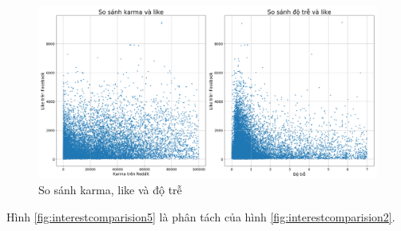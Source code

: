 \documentclass[10pt,a4paper]{article}
\begin{document}
\FloatBarrier
\begin{figure}[!ht]
    \centering
    \includegraphics[width=\textwidth]{img/InterestComparision2.png}
    \caption{So sánh karma, like và độ trễ}
    \label{fig:interestcomparision5}
\end{figure}

Hình \eqref{fig:interestcomparision5} là phân tách của hình \eqref{fig:interestcomparision2}.
\end{document}
